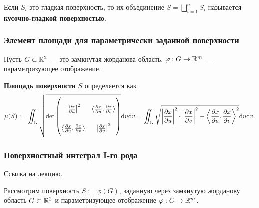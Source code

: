 \begin{definition*}
    Если $S_i$ это гладкая поверхность, то их объединение $S = \bigsqcup_{i=1}^{n} S_i$ называется \textbf{кусочно-гладкой поверхностью}.   
\end{definition*}

\subsubsection{Элемент площади для параметрически заданной поверхности}

Пусть $G \subset \mathbb{R}^2$ --- это замкнутая жорданова область, $\varphi: G \to \mathbb{R}^m$ --- параметризующее отображение.

\begin{definition*}
    \textbf{Площадь поверхности} $S$ определяется как
    \begin{equation*}
        \mu(S) := \iint_G \sqrt{
            \det 
            \begingroup
                \renewcommand*{\arraystretch}{2.5}
                \begin{pmatrix}
                    \left|\frac{\partial x}{\partial u}\right|^2 & \left\langle \frac{\partial x}{\partial u}, \frac{\partial x}{\partial v}\right\rangle \\
                    \left\langle \frac{\partial x}{\partial u}, \frac{\partial x}{\partial v}\right\rangle  & \left|\frac{\partial x}{\partial v}\right|^2\\
                \end{pmatrix}
            \endgroup
        } \dd u \dd v 
        = \iint_G \sqrt{
            \left|\frac{\partial x}{\partial u}\right|^2 \cdot \left|\frac{\partial x}{\partial v}\right|^2 - \left\langle \frac{\partial x}{\partial u}, \frac{\partial x}{\partial v}\right\rangle ^2
        } \dd u \dd v.
    \end{equation*}
\end{definition*}

\subsubsection{Поверхностный интеграл I-го рода}

\href{https://youtu.be/h_VmHDiSPJI?list=PLEwK9wdS5g0qV-430pfXzTawd6pI_VUgq&t=4348}{Ссылка на лекцию.}

Рассмотрим поверхность $S := \phi(G)$, заданную через замкнутую жорданову область $G \subset \mathbb{R}^2$ и параметризующее отображение $\varphi: G \to \mathbb{R}^m$.

